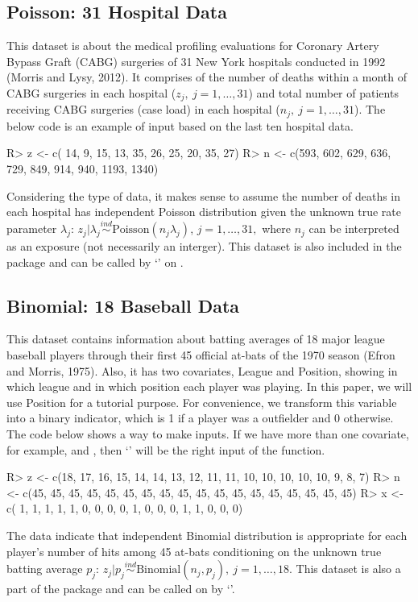\documentclass[article]{jss}
\begin{document}
\subsection{Poisson: 31 Hospital Data}
This dataset is about the medical profiling evaluations for Coronary Artery Bypass Graft (CABG) surgeries of 31 New York hospitals conducted in 1992 (Morris and Lysy, 2012). It comprises of the number of deaths within a month of CABG surgeries in each hospital ($z_{j},~j=1, \ldots, 31$) and total number of patients receiving CABG surgeries (case load) in each hospital ($n_{j},~j=1, \ldots, 31$). The below code is an example of input based on the last ten hospital data.
\begin{CodeChunk}
\begin{CodeInput}
R> z <- c( 14,   9,  15,  13,  35,  26,  25,  20,   35,   27)
R> n <- c(593, 602, 629, 636, 729, 849, 914, 940, 1193, 1340)
\end{CodeInput}
\end{CodeChunk}


Considering the type of data, it makes sense to assume the number of deaths in each hospital has independent Poisson distribution given the unknown true rate parameter $\lambda_{j}$: $z_{j}\vert \lambda_{j}\stackrel{ind}{\sim} \textrm{Poisson}(n_{j}\lambda_{j})$, $j=1, \ldots, 31,$ where $n_{j}$ can be interpreted as an exposure (not necessarily an interger). This dataset is also included in the package and can be called by `' on .

\subsection{Binomial: 18 Baseball Data}
This dataset contains information about batting averages of 18 major league baseball players through their first 45 official at-bats of the 1970 season (Efron and Morris, 1975). Also, it has two covariates, League and Position, showing in which league and in which position each player was playing. In this paper, we will use Position for a tutorial purpose. For convenience, we transform this variable into a binary indicator, which is 1 if a player was a outfielder and 0 otherwise. The code below shows a way to make inputs. If we have more than one covariate, for example,  and , then `' will be the right input of the  function.
\begin{CodeChunk}
\begin{CodeInput}
R> z <- c(18, 17, 16, 15, 14, 14, 13, 12, 11, 11, 10, 10, 10, 10, 10,  9,  8,  7)
R> n <- c(45, 45, 45, 45, 45, 45, 45, 45, 45, 45, 45, 45, 45, 45, 45, 45, 45, 45)
R> x <- c( 1,  1,  1,  1,  1,  0,  0,  0,  0,  1,  0,  0,  0,  1,  1,  0,  0,  0) 
\end{CodeInput}
\end{CodeChunk}
The data indicate that independent Binomial distribution is appropriate for each player's number of hits among 45 at-bats conditioning on the unknown true batting average $p_{j}$: $z_{j}\vert p_{j}\stackrel{ind}{\sim} \textrm{Binomial}(n_{j}, p_{j}), ~j=1, \ldots, 18$. This dataset is also a part of the package and can be called on  by `'.
\end{document}
